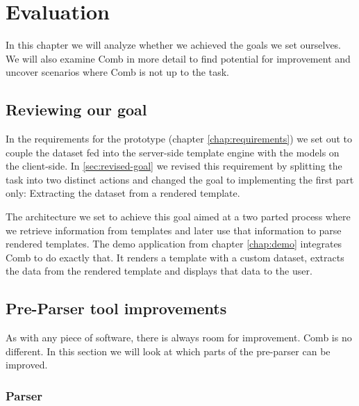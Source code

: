 \documentclass[thesis.tex]{subfiles}
\begin{document}
\chapter{Evaluation}
\label{chap:eval}
In this chapter we will analyze whether we achieved the goals we set ourselves.
We will also examine Comb in more detail to find potential for improvement and
uncover scenarios where Comb is not up to the task.

\section{Reviewing our goal}
In the requirements for the prototype (chapter \ref{chap:requirements})
we set out to couple the dataset fed into the server-side template engine with
the models on the client-side. In \ref{sec:revised-goal} we revised this
requirement by splitting the task into two distinct actions and changed the goal
to implementing the first part only: Extracting the dataset from a rendered
template.

The architecture we set to achieve this goal aimed at a two parted process where
we retrieve information from templates and later use that information to parse
rendered templates. The demo application from chapter \ref{chap:demo}
integrates Comb to do exactly that. It renders a template with a custom dataset,
extracts the data from the rendered template and displays that data to the user.

\section{Pre-Parser tool improvements}
As with any piece of software, there is always room for improvement.
Comb is no different. In this section we will look at which parts of the
pre-parser can be improved.

\subsection{Parser}
\end{document}
